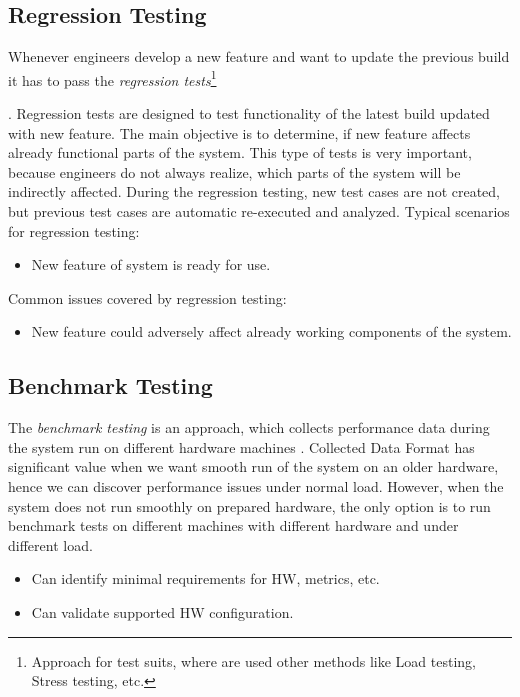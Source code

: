 \subsection*{Regression Testing}
Whenever engineers develop a new feature and want to update the previous build it has to pass the \emph{regression tests}\footnote{Approach for test suits, where are used other methods like Load testing, Stress testing, etc.}\addtocounter{footnote}{-1}\addtocounter{Hfootnote}{-1} \cite{STF:REGRESSION}. Regression tests are designed to test functionality of the latest build updated with new feature. The main objective is to determine, if new feature affects already functional parts of the system. This type of tests is very important, because engineers do not always realize, which parts of the system will be indirectly affected. During the regression testing, new test cases are not created, but previous test cases are automatic re-executed and analyzed.
Typical scenarios for regression testing:
\begin{itemize}
	\setlength\itemsep{0em}
	\item New feature of system is ready for use.
\end{itemize}
Common issues covered by regression testing:
\begin{itemize}
	\setlength\itemsep{0em}
	\item New feature could adversely affect already working components of the system.
\end{itemize}


\subsection*{Benchmark Testing}
The \emph{benchmark testing}\footnotemark{} is an approach, which collects performance data during the system run on different hardware machines \cite{Aho:Benchmarking}. Collected Data Format has significant value when we want smooth run of the system on an older hardware, hence we can discover performance issues under normal load. However, when the system does not run smoothly on prepared hardware, the only option is to run benchmark tests on different machines with different hardware and under different load.

\begin{itemize}
	\item Can identify minimal requirements for HW, metrics, etc.
	\item Can validate supported HW configuration.
\end{itemize}



